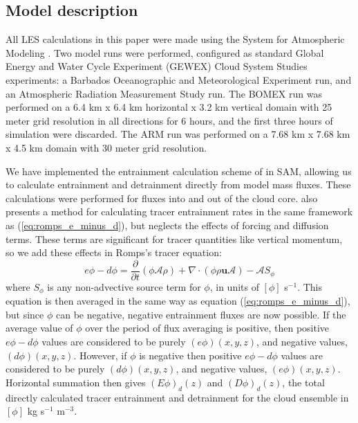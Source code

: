 \documentclass[draft,grl]{agutex}
\begin{document}
\begin{article}

\section{Model description}

All LES calculations in this paper were made using the System for Atmospheric 
Modeling \citep[SAM;][]{Khairoutdinov2003}.  Two model runs were performed, 
configured as standard Global Energy and Water Cycle Experiment (GEWEX) 
Cloud System Studies \citep[GCSS;][]{Randall2003} experiments: a Barbados 
Oceanographic and Meteorological Experiment \citep[BOMEX;][]{Siebesma2003} run,
and an Atmospheric Radiation Measurement Study \citep[ARM;][]{Brown2002} run. 
The BOMEX run was performed on a 6.4 km x 6.4 km horizontal x 3.2 km vertical 
domain with 25 meter grid resolution in all directions for 6 hours, and the 
first three hours of simulation were discarded. The ARM run was performed on a 
7.68 km x 7.68 km x 4.5 km domain with 30 meter grid resolution.

We have implemented the entrainment calculation scheme of \cite{Romps2010} in 
SAM, allowing us to calculate entrainment and detrainment directly from model 
mass fluxes.  These calculations were performed for fluxes into and out of the 
cloud core.  \citet[eq. 4]{Romps2010} also presents a method for calculating tracer entrainment 
rates in the same framework as (\ref{eq:romps_e_minus_d}), but neglects the effects of forcing and diffusion 
terms.  These terms are significant for tracer quantities like vertical 
momentum, so we add these effects in Romps's tracer equation:
\begin{equation}
  \label{eq:romps_ephi_minus_dphi}
  e\phi - d\phi = \frac{\partial}{\partial t}(\phi \mathcal{A} \rho) 
                + \nabla \cdot (\phi \rho \mathbf{u} \mathcal{A})
                - \mathcal{A}S_\phi
\end{equation}
where $S_\phi$ is any non-advective source term for $\phi$, in units of 
$[\phi]$ s$^{-1}$.  This equation is then averaged in the same way as equation 
(\ref{eq:romps_e_minus_d}), but since $\phi$ can be negative, negative 
entrainment fluxes are now possible.  If the average value of $\phi$ over the 
period of flux averaging is positive, then positive $e\phi-d\phi$ values are 
considered to be purely $(e\phi)(x,y,z)$, and negative values, 
$(d\phi)(x,y,z)$.  However, if $\phi$ is negative then positive $e\phi-d\phi$ 
values are considered to be purely $(d\phi)(x,y,z)$, and negative values, 
$(e\phi)(x,y,z)$.  Horizontal summation then gives $(E\phi)_d(z)$ and 
$(D\phi)_d(z)$, the total directly calculated tracer entrainment and 
detrainment for the cloud ensemble in $[\phi]$ kg s$^{-1}$ m$^{-3}$.


\end{article}
\end{document}
